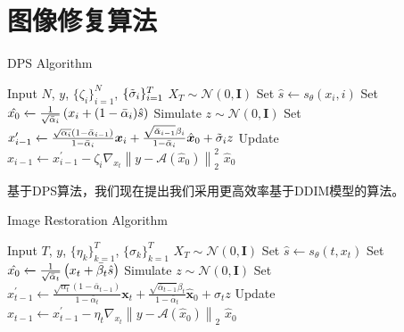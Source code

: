 \chapter{图像修复算法}

\begin{breakablealgorithm}
\caption{DPS Algorithm }
\label{DPS algorithm }
    \begin{algorithmic}[1]
   \REQUIRE Input $N$, $y$, $\{\zeta_i\}_{i=1}^{N}$, $\{\Tilde{\sigma}_i\}_{i=1}^{T}$
   \STATE $X_{T}\sim \mathcal{N}(0,\boldsymbol{I})$
   \STATE Set $\hat{s}\xleftarrow{} s_{\theta}(x_i,i)$
   \STATE Set $\hat{x_0} \xleftarrow{} \frac{1}{\sqrt{\Bar{\alpha}_i}}\left(x_i+(1-\Bar{\alpha}_i)\hat{s}\right)$
   \STATE Simulate $z\sim \mathcal{N}(0,\boldsymbol{I})$
   \STATE Set $x^{\prime}_{i-1}\xleftarrow{} \frac{\sqrt{\alpha_i}\left(1-\bar{\alpha}_{i-1}\right)}{1-\bar{\alpha}_i} \boldsymbol{x}_i+\frac{\sqrt{\bar{\alpha}_{i-1}} \beta_i}{1-\bar{\alpha}_i} \hat{\boldsymbol{x}}_0+\Tilde{\sigma}_i {z} $
   \STATE Update $x_{i-1}\xleftarrow{} {x}_{i-1}^{\prime}-\zeta_i \nabla_{{x}_t}\left\|{y}-\mathcal{A}\left(\hat{{x}}_0\right)\right\|_2^2 $
   \ENDFOR
   \RETURN $\hat{x}_0$ 
    \end{algorithmic}
\end{breakablealgorithm}
基于DPS算法，我们现在提出我们采用更高效率基于DDIM模型的算法。 
\begin{breakablealgorithm}
\caption{Image Restoration Algorithm }
\label{ours algorithm }
    \begin{algorithmic}[1]
   \REQUIRE Input $T$, $y$, $\{\eta_k\}_{k=1}^{T}$, $\{\sigma_k\}_{k=1}^{T}$
   \STATE $X_{T}\sim \mathcal{N}(0,\boldsymbol{I})$
   \STATE Set $\hat{s}\xleftarrow{} s_{\theta}(t,x_t)$
   \STATE Set $\hat{x_0} \xleftarrow{} \frac{1}{\sqrt{\Bar{\alpha}_t}}\left(x_t+\Bar{\beta}_t\hat{s}\right)$
   \STATE Simulate $z\sim \mathcal{N}(0,\boldsymbol{I})$
   \STATE Set $x^{\prime}_{t-1}\xleftarrow{} \frac{\sqrt{\alpha_t}\left(1-\bar{\alpha}_{t-1}\right)}{1-\bar{\alpha}_t} \boldsymbol{x}_t+\frac{\sqrt{\bar{\alpha}_{t-1}} \beta_t}{1-\bar{\alpha}_t} \hat{\boldsymbol{x}}_0+\sigma_t {z} $
   \STATE Update $x_{t-1}\xleftarrow{} {x}_{t-1}^{\prime}-\eta_t \nabla_{{x}_t}\left\|{y}-\mathcal{A}\left(\hat{{x}}_0\right)\right\|_2 $
   \ENDFOR
   \RETURN $\hat{x}_0$ 
    \end{algorithmic}
\end{breakablealgorithm}
